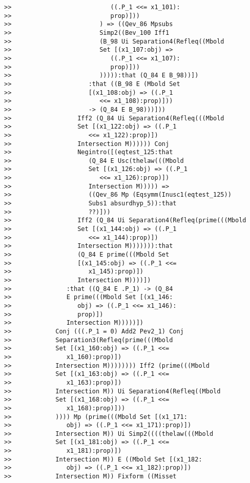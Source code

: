 \documentclass[12pt]{article}
\begin{document}
\begin{verbatim}
>>                           ((.P_1 <<= x1_101):
>>                           prop)]))
>>                        ) => ((Qev_86 Mpsubs
>>                        Simp2((Bev_100 Iff1
>>                        (B_98 Ui Separation4(Refleq((Mbold
>>                        Set [(x1_107:obj) =>
>>                           ((.P_1 <<= x1_107):
>>                           prop)]))
>>                        ))))):that (Q_84 E B_98))])
>>                     :that ((B_98 E (Mbold Set
>>                     [(x1_108:obj) => ((.P_1
>>                        <<= x1_108):prop)]))
>>                     -> (Q_84 E B_98)))]))
>>                  Iff2 (Q_84 Ui Separation4(Refleq(((Mbold
>>                  Set [(x1_122:obj) => ((.P_1
>>                     <<= x1_122):prop)])
>>                  Intersection M)))))) Conj
>>                  Negintro([(eqtest_125:that
>>                     (Q_84 E Usc(thelaw(((Mbold
>>                     Set [(x1_126:obj) => ((.P_1
>>                        <<= x1_126):prop)])
>>                     Intersection M))))) =>
>>                     ((Qev_86 Mp (Eqsymm(Inusc1(eqtest_125))
>>                     Subs1 absurdhyp_5)):that
>>                     ??)]))
>>                  Iff2 (Q_84 Ui Separation4(Refleq(prime(((Mbold
>>                  Set [(x1_144:obj) => ((.P_1
>>                     <<= x1_144):prop)])
>>                  Intersection M))))))):that
>>                  (Q_84 E prime(((Mbold Set
>>                  [(x1_145:obj) => ((.P_1 <<=
>>                     x1_145):prop)])
>>                  Intersection M))))])
>>               :that ((Q_84 E .P_1) -> (Q_84
>>               E prime(((Mbold Set [(x1_146:
>>                  obj) => ((.P_1 <<= x1_146):
>>                  prop)])
>>               Intersection M)))))])
>>            Conj (((.P_1 = 0) Add2 Pev2_1) Conj
>>            Separation3(Refleq(prime(((Mbold
>>            Set [(x1_160:obj) => ((.P_1 <<=
>>               x1_160):prop)])
>>            Intersection M)))))))) Iff2 (prime(((Mbold
>>            Set [(x1_163:obj) => ((.P_1 <<=
>>               x1_163):prop)])
>>            Intersection M)) Ui Separation4(Refleq((Mbold
>>            Set [(x1_168:obj) => ((.P_1 <<=
>>               x1_168):prop)]))
>>            )))) Mp (prime(((Mbold Set [(x1_171:
>>               obj) => ((.P_1 <<= x1_171):prop)])
>>            Intersection M)) Ui Simp2((((thelaw(((Mbold
>>            Set [(x1_181:obj) => ((.P_1 <<=
>>               x1_181):prop)])
>>            Intersection M)) E ((Mbold Set [(x1_182:
>>               obj) => ((.P_1 <<= x1_182):prop)])
>>            Intersection M)) Fixform ((Misset

\end{verbatim}
\end{document}
